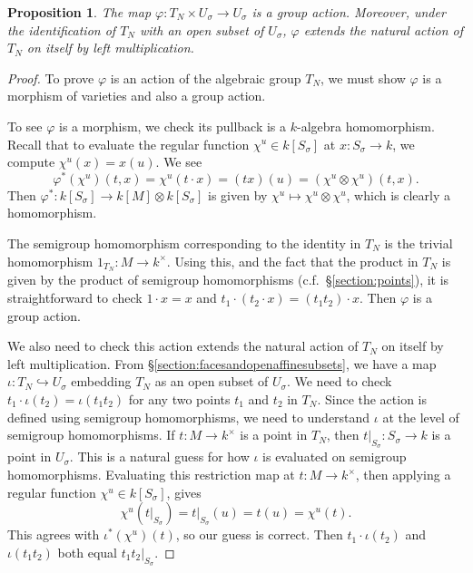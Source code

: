 \documentclass[12pt]{amsart}
\theoremstyle{plain}
\newtheorem{proposition}[theorem]{Proposition}
\theoremstyle{definition}
\begin{document}
\begin{proposition}
The map $\varphi : T_N \times U_\sigma \to U_\sigma$ is a group action.
Moreover, under the identification of $T_N$ with an open subset of $U_\sigma$, $\varphi$ extends the natural action of $T_N$ on itself by left multiplication.
\end{proposition}
\begin{proof}
To prove $\varphi$ is an action of the algebraic group $T_N$, we must show $\varphi$ is a morphism of varieties and also a group action.

To see $\varphi$ is a morphism, we check its pullback is a $k$-algebra homomorphism.
Recall that to evaluate the regular function $\chi^u \in k[S_\sigma]$ at $x : S_\sigma \to k$, we compute $\chi^u(x) = x(u)$.
We see
$$\varphi^*(\chi^u)(t, x) = \chi^u(t\cdot x) = (tx)(u) = (\chi^u \otimes \chi^u)(t,x).$$
Then $\varphi^* : k[S_\sigma] \to k[M] \otimes k[S_\sigma]$ is given by $\chi^u \mapsto \chi^u \otimes \chi^u$, which is clearly a homomorphism.

The semigroup homomorphism corresponding to the identity in $T_N$ is the trivial homomorphism $1_{T_N} : M \to k^\times$.
Using this, and the fact that the product in $T_N$ is given by the product of semigroup homomorphisms (c.f.\ \S \ref{section:points}), it is straightforward to check $1 \cdot x = x$ and $t_1\cdot(t_2\cdot x) = (t_1t_2)\cdot x$.
Then $\varphi$ is a group action.

We also need to check this action extends the natural action of $T_N$ on itself by left multiplication.
From \S\ref{section:facesandopenaffinesubsets}, we have a map $\iota : T_N \hookrightarrow U_\sigma$ embedding $T_N$ as an open subset of $U_\sigma$.
We need to check $t_1 \cdot \iota(t_2) = \iota(t_1 t_2)$ for any two points $t_1$ and $t_2$ in $T_N$.
Since the action is defined using semigroup homomorphisms, we need to understand $\iota$ at the level of semigroup homomorphisms.
If $t : M \to k^\times$ is a point in $T_N$, then $\left. t \right|_{S_\sigma} : S_\sigma \to k$ is a point in $U_\sigma$.
This is a natural guess for how $\iota$ is evaluated on semigroup homomorphisms.
Evaluating this restriction map at $t : M \to k^\times$, then applying a regular function $\chi^u \in k[S_\sigma]$, gives
$$\chi^u(\left. t \right|_{S_\sigma}) = \left. t \right|_{S_\sigma}(u) = t(u) = \chi^u(t).$$
This agrees with $\iota^*(\chi^u)(t)$, so our guess is correct.
Then $t_1 \cdot \iota(t_2)$ and $\iota(t_1 t_2)$ both equal $\left. t_1 t_2 \right|_{S_\sigma}$.
\end{proof}
\end{document}
